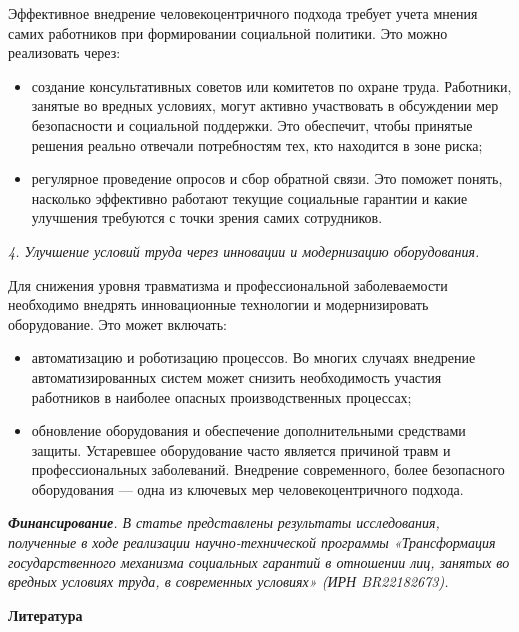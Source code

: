 \begin{multicols}{2}
Эффективное внедрение человекоцентричного подхода требует учета мнения
самих работников при формировании социальной политики. Это можно
реализовать через:

\begin{itemize}
\item
  создание консультативных советов или комитетов по охране труда.
  Работники, занятые во вредных условиях, могут активно участвовать в
  обсуждении мер безопасности и социальной поддержки. Это обеспечит,
  чтобы принятые решения реально отвечали потребностям тех, кто
  находится в зоне риска;
\item
  регулярное проведение опросов и сбор обратной связи. Это поможет
  понять, насколько эффективно работают текущие социальные гарантии и
  какие улучшения требуются с точки зрения самих сотрудников.
\end{itemize}

\emph{4. Улучшение условий труда через инновации и модернизацию
оборудования.}

Для снижения уровня травматизма и профессиональной заболеваемости
необходимо внедрять инновационные технологии и модернизировать
оборудование. Это может включать:

\begin{itemize}
\item
  автоматизацию и роботизацию процессов. Во многих случаях внедрение
  автоматизированных систем может снизить необходимость участия
  работников в наиболее опасных производственных процессах;
\item
  обновление оборудования и обеспечение дополнительными средствами
  защиты. Устаревшее оборудование часто является причиной травм и
  профессиональных заболеваний. Внедрение современного, более
  безопасного оборудования --- одна из ключевых мер человекоцентричного
  подхода.
\end{itemize}

\emph{{\bfseries Финансирование}. В статье представлены результаты
исследования, полученные в ходе реализации научно-технической программы
«Трансформация государственного механизма социальных гарантий в
отношении лиц, занятых во вредных условиях труда, в современных
условиях» (ИРН BR22182673).}


\end{multicols}
\begin{center}

{\bfseries Литература}
\end{center}
